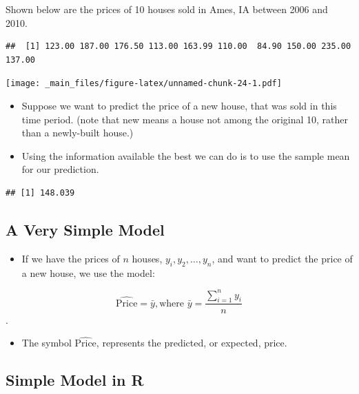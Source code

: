 \documentclass[]{book}
\newenvironment{Shaded}{\begin{snugshade}}{\end{snugshade}}
\newcommand{\KeywordTok}[1]{\textcolor[rgb]{0.13,0.29,0.53}{\textbf{#1}}}
\newcommand{\OperatorTok}[1]{\textcolor[rgb]{0.81,0.36,0.00}{\textbf{#1}}}
\newcommand{\NormalTok}[1]{#1}
\providecommand{\tightlist}{%
  \setlength{\itemsep}{0pt}\setlength{\parskip}{0pt}}
\begin{document}
Shown below are the prices of 10 houses sold in Ames, IA between 2006
and 2010.

\begin{verbatim}
##  [1] 123.00 187.00 176.50 113.00 163.99 110.00  84.90 150.00 235.00 137.00
\end{verbatim}

\texttt{[image: \_main\_files/figure-latex/unnamed-chunk-24-1.pdf]}

\begin{itemize}
\item
  Suppose we want to predict the price of a new house, that was sold in
  this time period. (note that new means a house not among the original
  10, rather than a newly-built house.)
\item
  Using the information available the best we can do is to use the
  sample mean for our prediction.
\end{itemize}

\begin{Shaded}
\end{Shaded}

\begin{verbatim}
## [1] 148.039
\end{verbatim}

\subsection{A Very Simple Model}\label{a-very-simple-model}

\begin{itemize}
\tightlist
\item
  If we have the prices of \(n\) houses, \(y_i, y_2, \ldots, y_n\), and
  want to predict the price of a new house, we use the model:
\end{itemize}

\[
\widehat{\text{Price}} = \bar{y},  \text{where } \bar{y}=\frac{\displaystyle\sum_{i=1}^ny_i}{n}\].

\begin{itemize}
\tightlist
\item
  The symbol \(\widehat{\text{Price}}\), represents the predicted, or
  expected, price.
\end{itemize}

\subsection{Simple Model in R}\label{simple-model-in-r}
\end{document}
